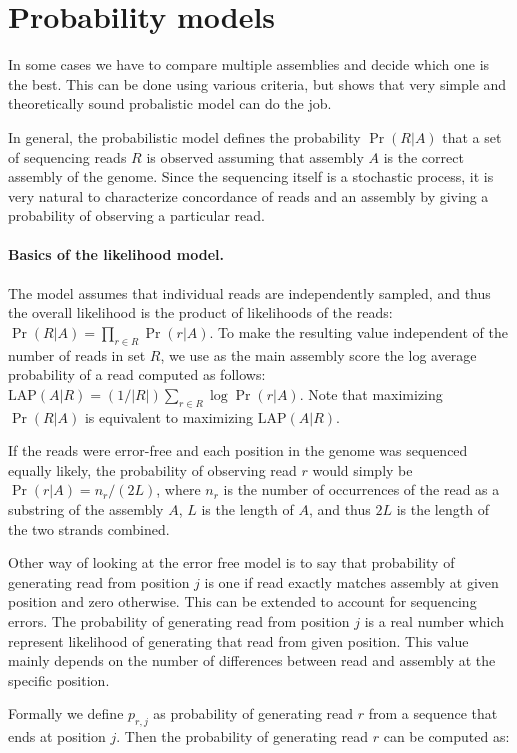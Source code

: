 \section{Probability models}
\label{sec:prob}
In some cases we have to compare multiple assemblies and decide which one is
the best. This can be done using various criteria, but \cite{Ghodsi2013} shows
that very simple and theoretically sound probalistic model can do the job.

In general, the probabilistic model defines the probability $\Pr(R|A)$ that a set of
sequencing reads $R$ is observed assuming that assembly $A$ is the
correct assembly of the genome. Since the sequencing itself is a
stochastic process, it is very natural to characterize concordance of
reads and an assembly by giving a probability of observing a particular
read.

\def\LAP{\mathrm{LAP}}

\paragraph{Basics of the likelihood model.}
The model assumes
that individual reads are independently sampled, and thus the overall
likelihood is the product of likelihoods of the reads:
$\Pr(R|A) = \prod_{r\in R} \Pr(r|A).$
To make
the resulting value independent of the number of reads in set 
$R$, we use as the main
assembly score the log average probability of a read computed as
follows: $\LAP(A|R) = (1/|R|)\sum_{r\in R} \log \Pr(r|A).$ Note that
maximizing $\Pr(R|A)$ is equivalent to maximizing $\LAP(A|R)$.

If the reads were error-free and each position in the genome was
sequenced equally likely, the probability of observing read $r$
would simply be $\Pr(r|A)=n_r/(2L)$, where $n_r$ is the number of 
occurrences of the read as a substring of the assembly $A$,
$L$ is the length of $A$, and thus $2L$ is the length of the two
strands combined.

Other way of looking at the error free model is to say that probability
of generating read from position $j$ is one if read exactly matches 
assembly at given position and zero otherwise. This can be extended
to account for sequencing errors. The probability of generating read
from position $j$ is a real number which represent likelihood of generating
that read from given position. This value mainly depends on the number
of differences between read and assembly at the specific position.

Formally we define $p_{r, j}$ as probability of generating read $r$ from a sequence
that ends at position $j$. Then the probability of generating read $r$ can be computed as:

